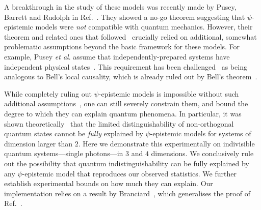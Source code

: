 \documentclass[aps,prl,floatfix,onecolumn,tightenlines,amsmath,amssymb,nofootinbib,12pt]{revtex4-2}
\begin{document}
A breakthrough in the study of these models was recently made by Pusey, Barrett and Rudolph in Ref.~\cite{Pusey2012}. They showed a no-go theorem suggesting that $\psi$-epistemic models were \emph{not} compatible with quantum mechanics. However, their theorem and related ones that followed~\cite{Colbeck2011,hardy2013are,Patra2013no-,Aaronson2013,Colbeck2013} crucially relied on additional, somewhat problematic assumptions beyond the basic framework for these models.
For example, Pusey \emph{et al}. assume that independently-prepared systems have independent physical states~\cite{Pusey2012}. This requirement has been challenged~\cite{Emerson2013} as being analogous to Bell's local causality, which is already ruled out by Bell's theorem~\cite{Bell1964}.

While completely ruling out $\psi$-epistemic models is impossible without such additional assumptions~\cite{Lewis2012,Aaronson2013}, one can still severely constrain them, and bound the degree to which they can explain quantum phenomena. In particular, it was shown theoretically~\cite{Barrett2014,Leifer2014,Branciard2014a} that the limited distinguishability of non-orthogonal quantum states cannot be \emph{fully} explained by $\psi$-epistemic models for systems of dimension larger than $2$.
Here we demonstrate this experimentally on indivisible quantum systems---single photons---in $3$ and $4$ dimensions. We conclusively rule out the possibility that quantum indistinguishability can be fully explained by any $\psi$-epistemic model that reproduces our observed statistics. We further establish experimental bounds on how much they can explain.
Our implementation relies on a result by Branciard~\cite{Branciard2014a}, which generalises the proof of Ref.~\cite{Barrett2014}.
\end{document}
